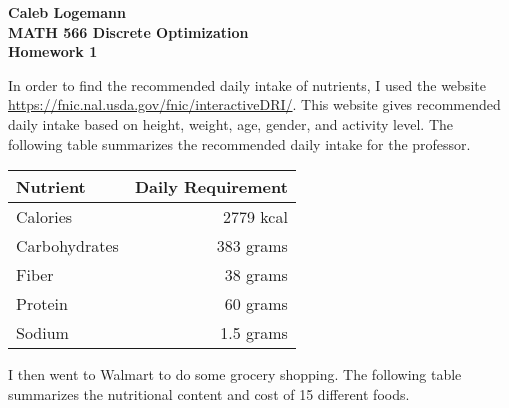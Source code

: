 \documentclass[11pt, oneside]{article}
\begin{document}
\noindent \textbf{\Large{Caleb Logemann \\
MATH 566 Discrete Optimization\\
Homework 1
}}

%

\noindent In order to find the recommended daily intake of nutrients, I used the website
\\ \href{https://fnic.nal.usda.gov/fnic/interactiveDRI/}{https://fnic.nal.usda.gov/fnic/interactiveDRI/}.
This website gives recommended daily intake based on height, weight, age,
gender, and activity level.
The following table summarizes the recommended daily intake for the professor.
    \begin{center}
        \begin{tabular}{lr}
            \toprule
            Nutrient      & Daily Requirement \\
            \midrule
            Calories      & 2779 kcal \\
            Carbohydrates & 383 grams  \\
            Fiber         & 38 grams \\
            Protein       & 60 grams \\
            Sodium        & 1.5 grams \\
            \bottomrule
        \end{tabular}
    \end{center}

\noindent I then went to Walmart to do some grocery shopping. 
The following table summarizes the nutritional content and cost of 15
different foods.
\end{document}

